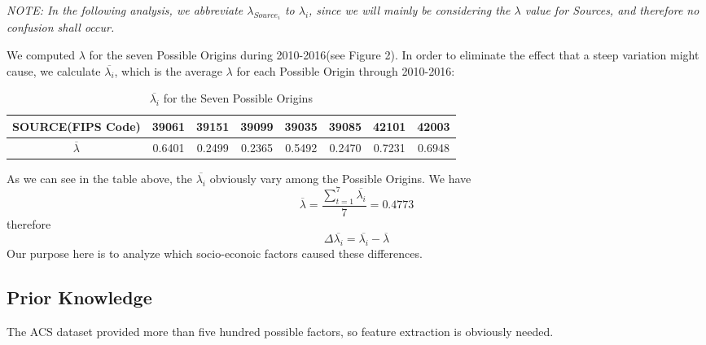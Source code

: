 \textit{
NOTE: In the following analysis, we abbreviate $\lambda_{Source_i}$ to $\lambda_i$, since we will mainly be considering the $\lambda$ value for Sources, and therefore no confusion shall occur. 
}

We computed $\lambda$ for the seven Possible Origins during 2010-2016(see Figure 2). In order to eliminate the effect that a steep variation might cause, we calculate $\overline{\lambda_i}$, which is the average $\lambda$ for each Possible Origin through 2010-2016:
\begin{table}[H]
	\centering
\begin{tabular}{|c|c|c|c|c|c|c|c|}
	\hline
	\rowcolor[HTML]{656565} 
	{\color[HTML]{FFFFFF} \textbf{SOURCE(FIPS Code)}} &{\color[HTML]{FFFFFF} \textbf{39061}} & {\color[HTML]{FFFFFF} \textbf{39151}} & {\color[HTML]{FFFFFF} \textbf{39099}}  & {\color[HTML]{FFFFFF} \textbf{39035}} & {\color[HTML]{FFFFFF} \textbf{39085}} & {\color[HTML]{FFFFFF} \textbf{42101}}  & {\color[HTML]{FFFFFF} \textbf{42003}}\\ \hline
	$\overline{\lambda}$ & 0.6401 & 0.2499 & 0.2365 & 0.5492 & 0.2470 & 0.7231 & 0.6948 \\ \hline
\end{tabular}
\centering
\caption{$\overline{\lambda_i}$ for the Seven Possible Origins}
\end{table}

As we can see in the table above, the $\overline{\lambda_i}$ obviously vary among the Possible Origins. We have
\begin{equation}
\overline{\lambda}=\frac{\sum_{t=1}^{7}\overline{\lambda_i}}{7}=0.4773
\end{equation}
therefore
\begin{equation}
\Delta \overline{\lambda_i} = \overline{\lambda_i} - \overline{\lambda}
\end{equation}
Our purpose here is to analyze which socio-econoic factors caused these differences.

\subsection{Prior Knowledge}
The ACS dataset provided more than five hundred possible factors, so feature extraction is obviously needed. 

